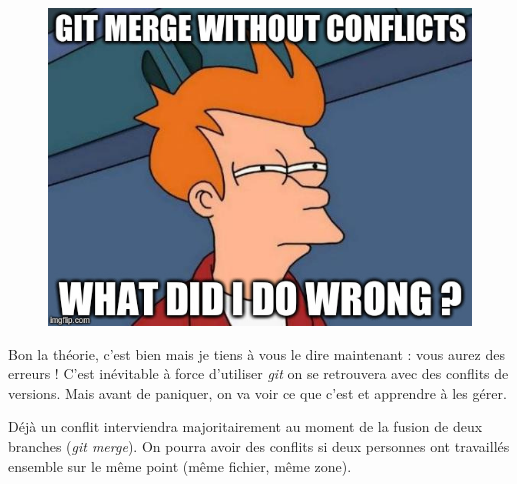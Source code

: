 \documentclass[12pt,a4paper]{article}
\begin{document}
\begin{figure}
\vspace*{-0.5\baselineskip}
\includegraphics[width=\linewidth]{gitmerge}
\end{figure}
Bon la théorie, c'est bien mais je tiens à vous le dire maintenant : vous aurez des erreurs ! C'est inévitable à force d'utiliser \emph{git} on se retrouvera avec des conflits de versions. Mais avant de paniquer, on va voir ce que c'est et apprendre à les gérer.

Déjà un conflit interviendra majoritairement au moment de la fusion de deux branches (\emph{git merge}). On pourra avoir des conflits si deux personnes ont travaillés ensemble sur le même point (même fichier, même zone).



\end{document}
